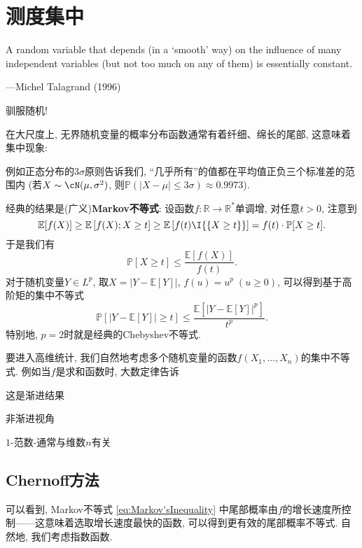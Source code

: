 \section{测度集中}

\epigraph{A random variable that depends (in a ‘smooth’ way) on the influence of many independent variables (but not too much on any of them) is essentially constant.}{---Michel Talagrand (1996)}

驯服随机! 

在大尺度上, 无界随机变量的概率分布函数通常有着纤细、绵长的尾部, 这意味着集中现象: 

例如正态分布的$3 \sigma$原则告诉我们, “几乎所有”的值都在平均值正负三个标准差的范围内 (若$X \sim \cN(\mu, \sigma^2)$, 则$\mathbb{P}(|X - \mu| \leq 3 \sigma) \approx 0.9973$). 

经典的结果是(广义)\textbf{Markov不等式}: 
设函数$f \colon \mathbb{R} \to \mathbb{R}^*$单调增, 对任意$t > 0$, 注意到
\begin{equation*}
	\mathbb{E}[f(X)] 
		\geq \mathbb{E}\left[f(X); X \geq t \right]
		\geq \mathbb{E}\left[f(t) \I{\{X \geq t\}} \right] 
		= f(t) \cdot \mathbb{P}[X \geq t].
\end{equation*}
于是我们有 
\begin{equation}\label{eq:Markov'sInequality}
	\mathbb{P}[X \geq t] \leq \frac{\mathbb{E}[f(X)]}{f(t)}.
\end{equation}
对于随机变量$Y \in L^p$, 取$X = |Y - \mathbb{E}[Y]|$, $f(u) = u^p\; (u \geq 0)$, 可以得到基于高阶矩的集中不等式
\begin{equation*}
	\mathbb{P}[|Y - \mathbb{E}[Y]| \geq t] \leq \frac{ \mathbb{E}[ |Y - \mathbb{E}[Y]|^p]}{t^p}. 
\end{equation*} 
特别地, $p=2$时就是经典的Chebyshev不等式.

要进入高维统计, 我们自然地考虑多个随机变量的函数$f(X_1, \dots, X_n)$的集中不等式. 
例如当$f$是求和函数时, 大数定律告诉

这是渐进结果

非渐进视角

$1$-范数-通常与维数$n$有关




\subsection{Chernoff方法}

可以看到, Markov不等式 \eqref{eq:Markov'sInequality} 中尾部概率由$f$的增长速度所控制——这意味着选取增长速度最快的函数, 可以得到更有效的尾部概率不等式. 
自然地, 我们考虑指数函数. 

